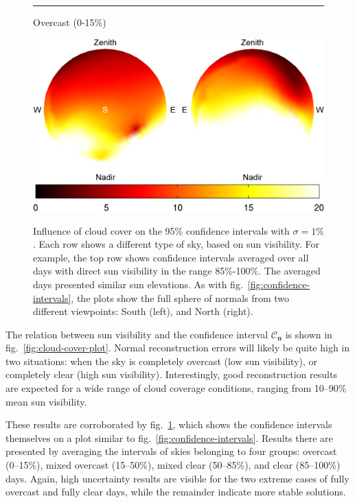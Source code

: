 \begin{figure}[t]
    \vspace{-.8em} \noindent\rule{\linewidth}{0.1pt}
    \begin{sideways}\begin{minipage}{.25\linewidth}\centering \scriptsize Overcast (0-15\%)\vspace{5pt} \end{minipage}\end{sideways}
    \includegraphics[width=.5\linewidth]{./figures/confidenceIntervals/overcast-mean_10pm.png} \\
    \vspace{3mm}
    \includegraphics[width=.51\linewidth]{./figures/confidenceIntervals/colorbar.png}
    \caption{Influence of cloud cover on the 95\% confidence intervals with $\sigma=1\%$. Each row shows a different type of sky, based on sun visibility. For example, the top row shows confidence intervals averaged over all days with direct sun visibility in the range 85\%-100\%. The averaged days presented similar sun elevations. As with fig.~\ref{fig:confidence-intervals}, the plots show the full sphere of normals from two different viewpoints: South (left), and North (right).}
    \label{fig:cloud-cover}
\end{figure}

The relation between sun visibility and the confidence interval $\mathcal{C}_\mathbf{n}$ is shown in fig.~\ref{fig:cloud-cover-plot}. Normal reconstruction errors will likely be quite high in two situations: when the sky is completely overcast (low sun visibility), or completely clear (high sun visibility). Interestingly, good reconstruction results are expected for a wide range of cloud coverage conditions, ranging from 10--90\% mean sun visibility.

These results are corroborated by fig.~\ref{fig:cloud-cover}, which shows the confidence intervals themselves on a plot similar to fig.~\ref{fig:confidence-intervals}. Results there are presented by averaging the intervals of skies belonging to four groups: overcast (0--15\%), mixed overcast (15--50\%), mixed clear (50--85\%), and clear (85--100\%) days. Again, high uncertainty results are visible for the two extreme cases of fully overcast and fully clear days, while the remainder indicate more stable solutions.

